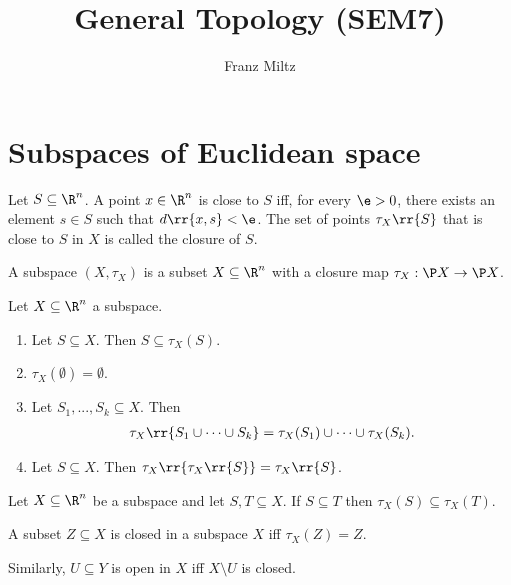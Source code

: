 \documentclass{article}
\begin{document}
\mkthmstwounified
\title{General Topology (SEM7)}
\author{Franz Miltz}
\maketitle
\tableofcontents
\pagebreak


\section{Subspaces of Euclidean space}
\label{sec:euclidean-subspaces}

\begin{definition}
  Let $S\subseteq \R^n$. A point $x\in\R^n$ is close to $S$ iff, for every $\e>0$, there
  exists an element $s\in S$ such that $d \rr{ x,s }<\e$. The set of points $\tau_X \rr{ S }$
  that is close to $S$ in $X$ is called the closure of $S$.

  A subspace $(X, \tau_X)$ is a subset $X\subseteq\R^n$ with a closure map
  $\tau_X:\P X \to \P X$.
\end{definition}

\begin{theorem}
  \label{prop:properties-of-closure}
  Let $X\subseteq\R^n$ a subspace.
  \begin{enumerate}
    \item Let $S\subseteq X$. Then $S\subseteq \tau_X(S)$.
    \item $\tau_X(\emptyset)=\emptyset$.
    \item Let $S_1,...,S_k\subseteq X$. Then  \begin{align*}
        \tau_X \rr{ S_1 \cup \cdots \cup S_k } = \tau_X (S_1) \cup \cdots \cup \tau_X (S_k).
      \end{align*}
    \item Let $S\subseteq X$. Then $\tau_X \rr{ \tau_X \rr{ S } } = \tau_X \rr{ S }$.
  \end{enumerate}
\end{theorem}

\begin{corollary}
  Let $X\subseteq\R^n$ be a subspace and let $S,T\subseteq X$. If $S\subseteq T$ then
  $\tau_X(S)\subseteq \tau_X(T)$.
\end{corollary}

\begin{definition}
  \label{def:closed}
  A subset $Z\subseteq X$ is closed in a subspace $X$ iff $\tau_X(Z)=Z$.

  Similarly, $U\subseteq Y$ is open in $X$ iff $X\setminus U$ is closed.
\end{definition}
\end{document}
